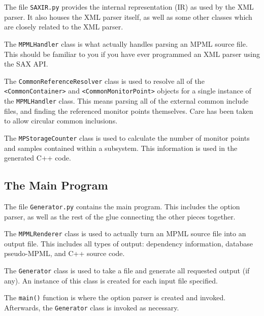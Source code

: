 \documentclass[letterpaper,12pt,oneside,pdftex]{article}
\newcommand{\mpml}[1]{\texttt{<#1>}}
\begin{document}
The file \texttt{SAXIR.py} provides the internal representation (IR) as used by
the XML parser. It also houses the XML parser itself, as well as some other
classes which are closely related to the XML parser.

The \texttt{MPMLHandler} class is what actually handles parsing an MPML source
file. This should be familiar to you if you have ever programmed an XML parser
using the SAX API.

The \texttt{CommonReferenceResolver} class is used to resolve all of the
\mpml{CommonContainer} and \mpml{CommonMonitorPoint} objects for a single
instance of the \texttt{MPMLHandler} class. This means parsing all of the
external common include files, and finding the referenced monitor points
themselves. Care has been taken to allow circular common inclusions.

The \texttt{MPStorageCounter} class is used to calculate the number of monitor
points and samples contained within a subsystem. This information is used in the
generated C++ code.

\subsection{The Main Program}

The file \texttt{Generator.py} contains the main program. This includes the
option parser, as well as the rest of the glue connecting the other pieces
together.

The \texttt{MPMLRenderer} class is used to actually turn an MPML source file
into an output file. This includes all types of output: dependency information,
database pseudo-MPML, and C++ source code.

The \texttt{Generator} class is used to take a file and generate all requested
output (if any). An instance of this class is created for each input file
specified.

The \texttt{main()} function is where the option parser is created and invoked.
Afterwards, the \texttt{Generator} class is invoked as necessary.
\end{document}
